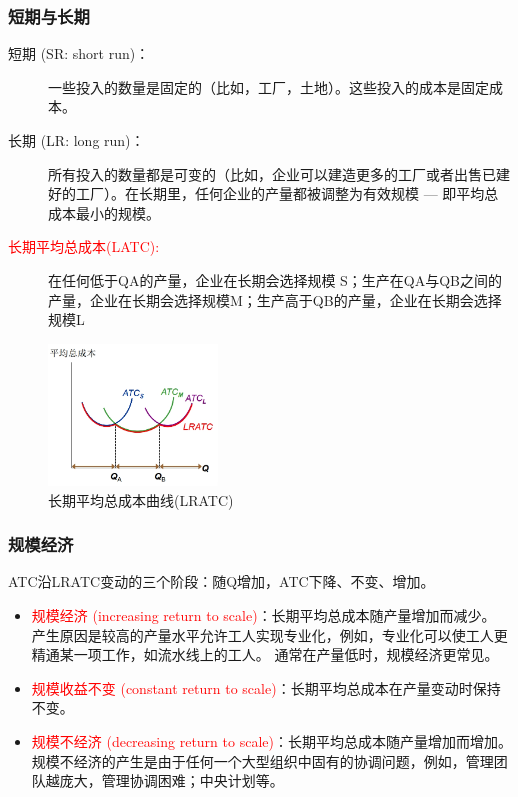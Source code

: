\documentclass[12pt,a4paper]{article}
\begin{document}
\subsubsection{短期与长期}

\begin{description}
  \item[短期 (SR: short run)：] 一些投入的数量是固定的（比如，工厂，土地）。这些投入的成本是固定成本。
  \item[长期 (LR: long run)：] 所有投入的数量都是可变的（比如，企业可以建造更多的工厂或者出售已建好的工厂）。在长期里，任何企业的产量都被调整为有效规模 — 即平均总成本最小的规模。
  \item[\textcolor{red}{长期平均总成本(LATC):}] 在任何低于QA的产量，企业在长期会选择规模 S；生产在QA与QB之间的产量，企业在长期会选择规模M；生产高于QB的产量，企业在长期会选择规模L 
\end{description}


\begin{figure}[H] 
  \centering %
  \includegraphics[width=0.4\textwidth]{长期平均总成本.png} 
  \caption{长期平均总成本曲线(LRATC)} %
\end{figure}

\subsubsection{规模经济}

ATC沿LRATC变动的三个阶段：随Q增加，ATC下降、不变、增加。

\begin{itemize}
  \item \textcolor{red}{规模经济 (increasing return to scale)}：长期平均总成本随产量增加而减少。 产生原因是较高的产量水平允许工人实现专业化，例如，专业化可以使工人更精通某一项工作，如流水线上的工人。 通常在产量低时，规模经济更常见。

  \item \textcolor{red}{规模收益不变 (constant return to scale)}：长期平均总成本在产量变动时保持不变。

  \item \textcolor{red}{规模不经济 (decreasing return to scale)}：长期平均总成本随产量增加而增加。 规模不经济的产生是由于任何一个大型组织中固有的协调问题，例如，管理团队越庞大，管理协调困难；中央计划等。
\end{itemize}
\end{document}

